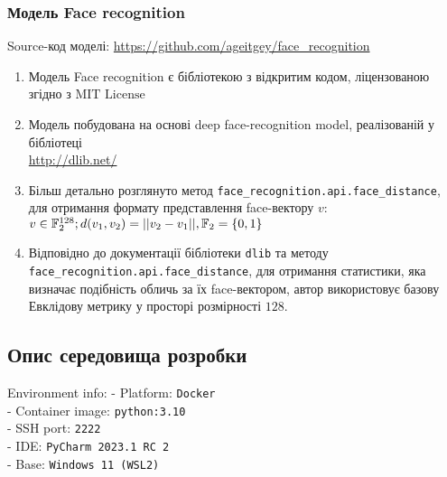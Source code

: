\documentclass[11pt]{article}
\providecommand{\tightlist}{%
      \setlength{\itemsep}{0pt}\setlength{\parskip}{0pt}}
\begin{document}
    \hypertarget{ux43cux43eux434ux435ux43bux44c-face-recognition}{%
\subsubsection{Модель Face
recognition}\label{ux43cux43eux434ux435ux43bux44c-face-recognition}}

Source-код моделі: \url{https://github.com/ageitgey/face_recognition}

\begin{enumerate}
\def\labelenumi{\arabic{enumi}.}
\tightlist
\item
  Модель Face recognition є бібліотекою з відкритим кодом, ліцензованою
  згідно з \(\text{MIT License}\)
\item
  Модель побудована на основі deep face-recognition model, реалізованій
  у бібліотеці \\
  \url{http://dlib.net/}
\item
  Більш детально розглянуто метод
  \texttt{face\_recognition.api.face\_distance}, для отримання формату
  представлення face-вектору \(v\):
  \(v \in \mathbb{F}_2^{128}; \space d(v_1,v_2) = ||v_2-v_1||, \space \mathbb{F}_2 = \{0,1\}\)
\item
  Відповідно до документації бібліотеки \texttt{dlib} та методу
  \texttt{face\_recognition.api.face\_distance}, для отримання
  статистики, яка визначає подібність обличь за їх face-вектором, автор
  використовує базову Евклідову метрику у просторі розмірності \(128\).
\end{enumerate}

\vspace{20ex}

    \hypertarget{ux43eux43fux438ux441-ux441ux435ux440ux435ux434ux43eux432ux438ux449ux430-ux440ux43eux437ux440ux43eux431ux43aux438}{%
\subsection{Опис середовища
розробки}\label{ux43eux43fux438ux441-ux441ux435ux440ux435ux434ux43eux432ux438ux449ux430-ux440ux43eux437ux440ux43eux431ux43aux438}}

Environment info: 
- Platform: \texttt{Docker} \\
- Container image: \texttt{python:3.10} \\
- SSH port: \texttt{2222} \\
- IDE: \texttt{PyCharm\ 2023.1\ RC\ 2} \\
- Base: \texttt{Windows\ 11\ (WSL2)}\\
\end{document}

